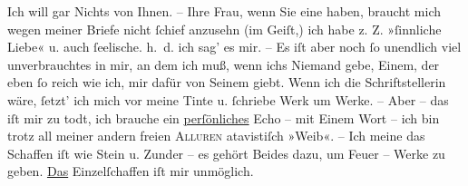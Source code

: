 \pstart
           Ich will gar Nichts von Ihnen. – Ihre Frau, wenn Sie eine haben, braucht mich wegen meiner \introOben{}Briefe\introOben{} nicht{ }ſchief anzusehn (im Geiſt,) ich habe z. Z.
               »ſinnliche Liebe« u. auch{ }ſeelische. h. d. ich sag’ es mir. – Es iſt aber noch{ }ſo
               unendlich viel unverbrauchtes in mir, an dem ich  muß, wenn ichs Niemand gebe, Einem, der eben{ }ſo reich wie ich, mir
               dafür von Seinem giebt. Wenn ich die Schriftstellerin \label{K_L04551-3v}\label{K_L04551-3}
               wäre,{ }ſetzt’ ich mich vor meine Tinte u.{ }ſchriebe Werk um Werke. – Aber – das iſt mir
               zu todt, ich brauche ein \uline{perſönliches} Echo – mit
               Einem Wort – ich bin trotz all meiner andern freien \textsc{Alluren}
               atavistiſch »Weib«. – Ich meine das Schaffen iſt wie Stein u. Zunder – es gehört
               Beides dazu, um Feuer – Werke zu geben. \uline{Das}
               Einzelſchaffen iſt mir unmöglich.\pend
           
